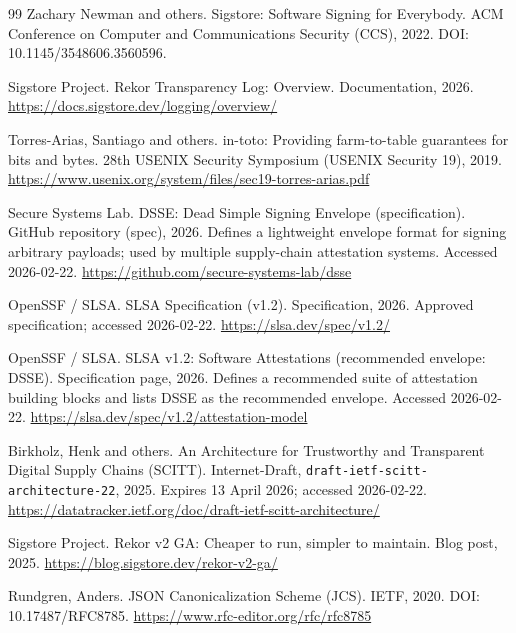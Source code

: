 \documentclass[11pt]{article}
\begin{document}
\begin{thebibliography}{99}
Zachary Newman and others.
\newblock Sigstore: Software Signing for Everybody.
\newblock ACM Conference on Computer and Communications Security (CCS), 2022.
\newblock DOI: 10.1145/3548606.3560596.

{Sigstore Project}.
\newblock Rekor Transparency Log: Overview.
\newblock Documentation, 2026.
\newblock \url{https://docs.sigstore.dev/logging/overview/}

Torres-Arias, Santiago and others.
\newblock in-toto: Providing farm-to-table guarantees for bits and bytes.
\newblock 28th {USENIX} Security Symposium ({USENIX} Security 19), 2019.
\newblock \url{https://www.usenix.org/system/files/sec19-torres-arias.pdf}

{Secure Systems Lab}.
\newblock DSSE: Dead Simple Signing Envelope (specification).
\newblock GitHub repository (spec), 2026.
\newblock Defines a lightweight envelope format for signing arbitrary payloads; used by multiple supply-chain attestation systems. Accessed 2026-02-22.
\newblock \url{https://github.com/secure-systems-lab/dsse}

{OpenSSF / SLSA}.
\newblock SLSA Specification (v1.2).
\newblock Specification, 2026.
\newblock Approved specification; accessed 2026-02-22.
\newblock \url{https://slsa.dev/spec/v1.2/}

{OpenSSF / SLSA}.
\newblock SLSA v1.2: Software Attestations (recommended envelope: DSSE).
\newblock Specification page, 2026.
\newblock Defines a recommended suite of attestation building blocks and lists DSSE as the recommended envelope. Accessed 2026-02-22.
\newblock \url{https://slsa.dev/spec/v1.2/attestation-model}

Birkholz, Henk and others.
\newblock An Architecture for Trustworthy and Transparent Digital Supply Chains (SCITT).
\newblock Internet-Draft, \texttt{draft-ietf-scitt-architecture-22}, 2025.
\newblock Expires 13 April 2026; accessed 2026-02-22.
\newblock \url{https://datatracker.ietf.org/doc/draft-ietf-scitt-architecture/}

{Sigstore Project}.
\newblock Rekor v2 GA: Cheaper to run, simpler to maintain.
\newblock Blog post, 2025.
\newblock \url{https://blog.sigstore.dev/rekor-v2-ga/}

Rundgren, Anders.
\newblock JSON Canonicalization Scheme (JCS).
\newblock IETF, 2020.
\newblock DOI: 10.17487/RFC8785.
\newblock \url{https://www.rfc-editor.org/rfc/rfc8785}


\end{thebibliography}
\end{document}
